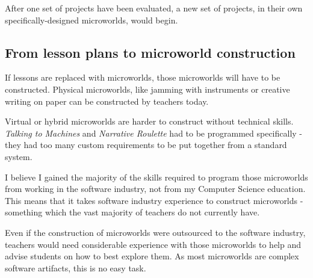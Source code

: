 After one set of projects have been evaluated, a new set of projects, in
their own specifically-designed microworlds, would begin.

\subsection{From lesson plans to microworld construction}

If lessons are replaced with microworlds, those microworlds will have to
be constructed. Physical microworlds, like jamming with instruments or
creative writing on paper can be constructed by teachers today.

Virtual or hybrid microworlds are harder to construct without technical
skills. \emph{Talking to Machines} and \emph{Narrative Roulette} had to
be programmed specifically - they had too many custom requirements to be
put together from a standard system.

I believe I gained the majority of the skills required to program those
microworlds from working in the software industry, not from my Computer
Science education. This means that it takes software industry experience
to construct microworlds - something which the vast majority of teachers
do not currently have.

Even if the construction of microworlds were outsourced to the software
industry, teachers would need considerable experience with those
microworlds to help and advise students on how to best explore them. As
most microworlds are complex software artifacts, this is no
easy task.

